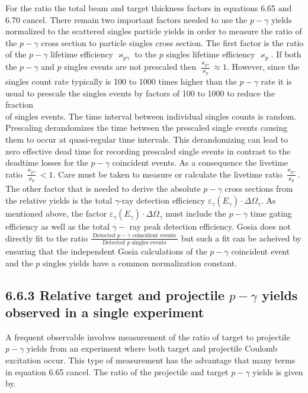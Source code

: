 \documentclass[10pt]{article}
\begin{document}
For the ratio the total beam and target thickness factors in equations 6.65 and 6.70 cancel. There remain two important factors needed to use the $p-\gamma$ yields normalized to the scattered singles particle yields in order to measure the ratio of the $p-\gamma$ cross section to particle singles cross section. The first factor is the ratio of the $p-\gamma$ lifetime efficiency $\varkappa_{p \gamma}$ to the $p$ singles lifetime efficiency $\varkappa_{p}$. If both the $p-\gamma$ and $p$ singles events are not prescaled then $\frac{\varkappa_{p \gamma}}{\varkappa_{p}} \approx 1$. However, since the singles count rate typically is 100 to 1000 times higher than the $p-\gamma$ rate it is usual to prescale the singles events by factors of 100 to 1000 to reduce the fraction\\
of singles events. The time interval between individual singles counts is random. Prescaling derandomizes the time between the prescaled single events causing them to occur at quasi-regular time intervals. This derandomizing can lead to zero effective dead time for recording prescaled single events in contrast to the deadtime losses for the $p-\gamma$ coincident events. As a consequence the livetime ratio $\frac{\varkappa_{p \gamma}}{\varkappa_{p}}<1$. Care must be taken to measure or calculate the livetime ratio $\frac{\varkappa_{p \gamma}}{\varkappa_{p}}$. The other factor that is needed to derive the absolute $p-\gamma$ cross sections from the relative yields is the total $\gamma$-ray detection efficiency $\varepsilon_{\gamma}\left(E_{\gamma}\right) \cdot \Delta \Omega_{\gamma}$. As mentioned above, the factor $\varepsilon_{\gamma}\left(E_{\gamma}\right) \cdot \Delta \Omega_{\gamma}$ must include the $p-\gamma$ time gating efficiency as well as the total $\gamma-$ ray peak detection efficiency. Gosia does not directly fit to the ratio $\frac{\text { Detected } p-\gamma \text { coincident events }}{\text { Detected } p \text { singles events }}$ but such a fit can be acheived by ensuring that the independent Gosia calculations of the $p-\gamma$ coincident event and the $p$ singles yields have a common normalization constant.

\subsection*{6.6.3 Relative target and projectile $p-\gamma$ yields observed in a single experiment}
A frequent observable involves measurement of the ratio of target to projectile $p-\gamma$ yields from an experiment where both target and projectile Coulomb excitation occur. This type of measurement has the advantage that many terms in equation 6.65 cancel. The ratio of the projectile and target $p-\gamma$ yields is given by.
\end{document}
